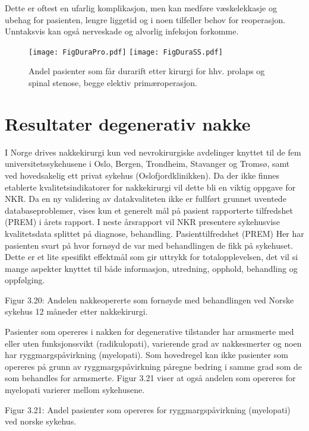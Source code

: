 \documentclass [norsk,a4paper,twoside]{article}\usepackage[]{graphicx}\usepackage[]{color}
\begin{document}

Dette er oftest en ufarlig komplikasjon, men kan medføre væskelekkasje og
ubehag for pasienten, lengre liggetid og i noen tilfeller behov for reoperasjon.
Unntaksvis kan også nerveskade og alvorlig infeksjon forkomme.
\begin{figure}[ht]
	\centering \texttt{[image: FigDuraPro.pdf]}
	\centering \texttt{[image: FigDuraSS.pdf]}
	\caption{\label{fig:Dura} Andel pasienter som får durarift etter kirurgi for hhv. prolaps og spinal stenose, begge elektiv primæroperasjon.}
\end{figure}




\clearpage

\section{Resultater degenerativ nakke}


I Norge drives nakkekirurgi kun ved nevrokirurgiske avdelinger knyttet til de fem
universitetssykehusene i Oslo, Bergen, Trondheim, Stavanger og Tromsø, samt ved
hovedsakelig ett privat sykehus (Oslofjordklinikken).
Da der ikke finnes etablerte kvalitetsindikatorer for nakkekirurgi vil dette bli en
viktig oppgave for NKR. Da en ny validering av datakvaliteten ikke er fullført grunnet
uventede databaseproblemer, vises kun et generelt mål på pasient rapporterte
tilfredshet (PREM) i årets rapport. I neste årsrapport vil NKR presentere sykehusvise
kvalitetsdata splittet på diagnose, behandling.
Pasienttilfredshet (PREM)
Her har pasienten svart på hvor fornøyd de var med behandlingen de fikk på
sykehuset. Dette er et lite spesifikt effektmål som gir uttrykk for totalopplevelsen,
det vil si mange aspekter knyttet til både informasjon, utredning, opphold,
behandling og oppfølging.

Figur 3.20: Andelen nakkeopererte som fornøyde med behandlingen ved Norske
sykehus 12 måneder etter nakkekirurgi.

Pasienter som opereres i nakken for degenerative tilstander har armsmerte med
eller uten funksjonssvikt (radikulopati), varierende grad av nakkesmerter og noen
har ryggmargspåvirkning (myelopati). Som hovedregel kan ikke pasienter som
opereres på grunn av ryggmargspåvirkning påregne bedring i samme grad som de
som behandles for armsmerte. Figur 3.21 viser at også andelen som opereres for
myelopati varierer mellom sykehusene.

Figur 3.21: Andel pasienter som opereres for ryggmargspåvirkning (myelopati) ved
norske sykehus.
\end{document}
